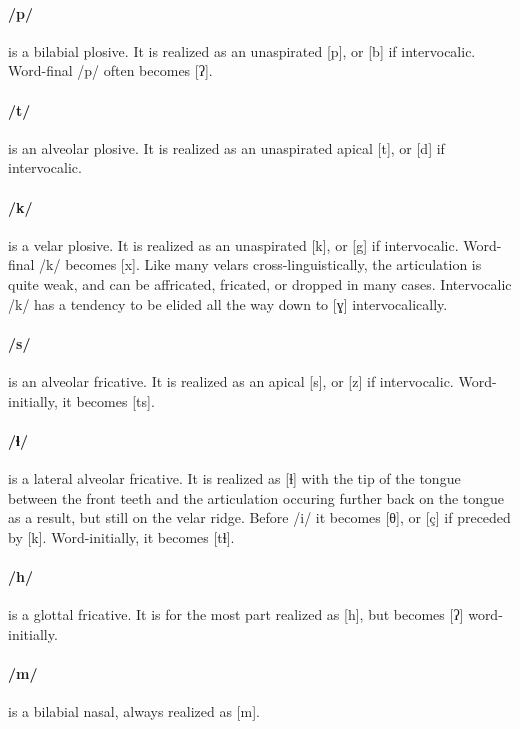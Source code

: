 \documentclass[smallroyalvopaper,9pt]{memoir} %
\newcommand{\bind}{\symbol{"0361}}
\begin{document}
\paragraph{/p/} is a bilabial plosive. It is realized as an unaspirated [p], or [b] if intervocalic. Word-final /p/ often becomes [ʔ].

\paragraph{/t/} is an alveolar plosive. It is realized as an unaspirated apical [t], or [d] if intervocalic.

\paragraph{/k/} is a velar plosive. It is realized as an unaspirated [k], or [g] if intervocalic. Word-final /k/ becomes [x]. Like many velars cross-linguistically, the articulation is quite weak, and can be affricated, fricated, or dropped in many cases. Intervocalic /k/ has a tendency to be elided all the way down to [ɣ] intervocalically.

\paragraph{/s/} is an alveolar fricative. It is realized as an apical [s], or [z] if intervocalic. Word-initially, it becomes [t\bind{}s].

\paragraph{/ɬ/} is a lateral alveolar fricative. It is realized as [ɬ] with the tip of the tongue between the front teeth and the articulation occuring further back on the tongue as a result, but still on the velar ridge. Before /i/ it becomes [θ], or [ç] if preceded by [k]. Word-initially, it becomes [t\bind{}ɬ].

\paragraph{/h/} is a glottal fricative. It is for the most part realized as [h], but becomes [ʔ] word-initially.

\paragraph{/m/} is a bilabial nasal, always realized as [m].
\end{document}
